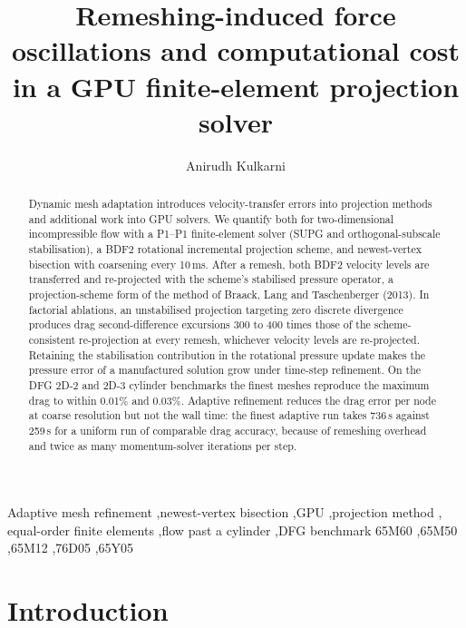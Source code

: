 \documentclass[preprint,12pt,number]{elsarticle}
\begin{document}
\begin{frontmatter}

\title{Remeshing-induced force oscillations and computational cost in a GPU finite-element
projection solver}

\author[pdeu]{Anirudh Kulkarni}

\begin{abstract}
Dynamic mesh adaptation introduces velocity-transfer errors into projection methods and
additional work into GPU solvers. We quantify both for two-dimensional incompressible flow with
a P1--P1 finite-element solver (SUPG and orthogonal-subscale stabilisation), a BDF2 rotational
incremental projection scheme, and newest-vertex bisection with coarsening every 10\,ms. After
a remesh, both BDF2 velocity levels are transferred and re-projected with the scheme's
stabilised pressure operator, a projection-scheme form of the method of Braack, Lang and
Taschenberger (2013). In factorial ablations, an unstabilised projection targeting zero discrete
divergence produces drag second-difference excursions 300 to 400 times those of the
scheme-consistent re-projection at every remesh, whichever velocity levels are re-projected.
Retaining the stabilisation contribution in the rotational pressure update makes the pressure
error of a manufactured solution grow under time-step refinement. On the DFG 2D-2 and 2D-3
cylinder benchmarks the finest meshes reproduce the maximum drag to within 0.01\% and 0.03\%.
Adaptive refinement reduces the drag error per node at coarse resolution but not the wall time:
the finest adaptive run takes 736\,s against 259\,s for a uniform run of comparable drag
accuracy, because of remeshing overhead and twice as many momentum-solver iterations per step.
\end{abstract}

\begin{keyword}
Adaptive mesh refinement \sep newest-vertex bisection \sep GPU \sep projection method \sep
equal-order finite elements \sep flow past a cylinder \sep DFG benchmark
\MSC[2020] 65M60 \sep 65M50 \sep 65M12 \sep 76D05 \sep 65Y05
\end{keyword}

\end{frontmatter}

\section{Introduction}
\label{sec:intro}
\end{document}
